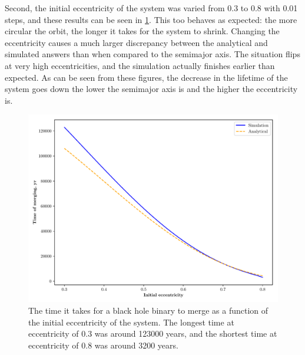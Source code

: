 \documentclass[english, oneside]{HYgradu}
\begin{document}
Second, the initial eccentricity of the system was varied from 0.3 to 0.8 with 0.01 steps, and these results can be seen in \ref{fig:bh-merge-ecc}. This too behaves as expected: the more circular the orbit, the longer it takes for the system to shrink. Changing the eccentricity causes a much larger discrepancy between the analytical and simulated answers than when compared to the semimajor axis. The situation flips at very high eccentricities, and the simulation actually finishes earlier than expected. As can be seen from these figures, the decrease in the lifetime of the system goes down the lower the semimajor axis is and the higher the eccentricity is.
\begin{figure}[h!tb]
\centering
\includegraphics[scale=0.6]{../images/bh-merge-ecc.pdf}
\caption{The time it takes for a black hole binary to merge as a function of the initial eccentricity of the system. The longest time at eccentricity of 0.3 was around 123000 years, and the shortest time at eccentricity of 0.8 was around 3200 years.}
\label{fig:bh-merge-ecc}
\end{figure}
\end{document}
